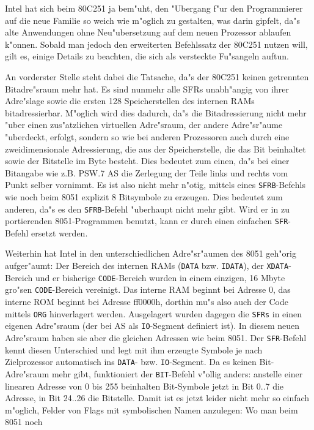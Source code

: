 \documentclass[12pt,a4paper,twoside]{report}
\newcommand{\tty}[1]{{\tt #1}}
\begin{document}
Intel hat sich beim 80C251 ja bem"uht, den "Ubergang f"ur den Programmierer
auf die neue Familie so weich wie m"oglich zu gestalten, was darin gipfelt,
da"s alte Anwendungen ohne Neu"ubersetzung auf dem neuen Prozessor ablaufen
k"onnen.  Sobald man jedoch den erweiterten Befehlssatz der 80C251 nutzen
will, gilt es, einige Details zu beachten, die sich als versteckte
Fu"sangeln auftun.
\par
An vorderster Stelle steht dabei die Tatsache, da"s der 80C251 keinen
getrennten Bitadre"sraum mehr hat.  Es sind nunmehr alle SFRs unabh"angig
von ihrer Adre"slage sowie die ersten 128 Speicherstellen des internen
RAMs bitadressierbar.  M"oglich wird dies dadurch, da"s die Bitadressierung
nicht mehr "uber einen zus"atzlichen virtuellen Adre"sraum, der andere
Adre"sr"aume "uberdeckt, erfolgt, sondern so wie bei anderen Prozessoren
auch durch eine zweidimensionale Adressierung, die aus der Speicherstelle,
die das Bit beinhaltet sowie der Bitstelle im Byte besteht.  Dies bedeutet
zum einen, da"s bei einer Bitangabe wie z.B. PSW.7 AS die Zerlegung der
Teile links und rechts vom Punkt selber vornimmt.  Es ist also nicht mehr
n"otig, mittels eines \tty{SFRB}-Befehls wie noch beim 8051 explizit 8
Bitsymbole zu erzeugen.  Dies bedeutet zum anderen, da"s es den
\tty{SFRB}-Befehl "uberhaupt nicht mehr gibt.  Wird er in zu portierenden
8051-Programmen benutzt, kann er durch einen einfachen \tty{SFR}-Befehl
ersetzt werden.
\par
Weiterhin hat Intel in den unterschiedlichen Adre"sr"aumen des 8051
geh"orig aufger"aumt: Der Bereich des internen RAMs (\tty{DATA} bzw.
\tty{IDATA}), der \tty{XDATA}-Bereich und er bisherige \tty{CODE}-Bereich
wurden in einem einzigen, 16 Mbyte gro"sen \tty{CODE}-Bereich vereinigt.
Das interne RAM beginnt bei Adresse 0, das interne ROM beginnt bei
Adresse ff0000h, dorthin mu"s also auch der Code mittels \tty{ORG}
hinverlagert werden.  Ausgelagert wurden dagegen die \tty{SFRs} in einen
eigenen Adre"sraum (der bei AS als \tty{IO}-Segment definiert ist).  In
diesem neuen Adre"sraum haben sie aber die gleichen Adressen wie beim 8051.
Der \tty{SFR}-Befehl kennt diesen Unterschied und legt mit ihm erzeugte
Symbole je nach Zielprozessor automatisch ins \tty{DATA}- bzw.
\tty{IO}-Segment.  Da es keinen Bit-Adre"sraum mehr gibt, funktioniert der
\tty{BIT}-Befehl v"ollig anders: anstelle einer linearen Adresse von 0 bis
255 beinhalten Bit-Symbole jetzt in Bit 0..7 die Adresse, in Bit 24..26
die Bitstelle.  Damit ist es jetzt leider nicht mehr so einfach m"oglich,
Felder von Flags mit symbolischen Namen anzulegen: Wo man beim 8051 noch
\end{document}
